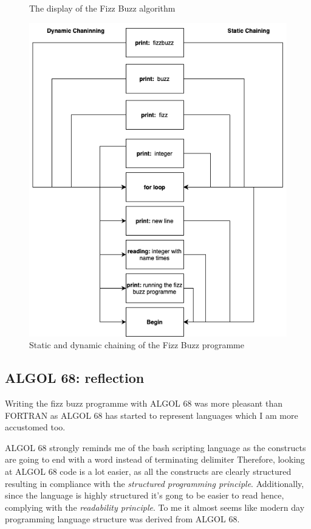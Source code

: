 \documentclass[
	12pt, %
]{fphw}
\begin{document}
\begin{figure}[!htb]
\begin{minipage}[b]{0.45\textwidth}
    \caption{The display of the Fizz Buzz algorithm}
    \label{ALGOL:Display}
  \end{minipage}
  \hfill
  \begin{minipage}[b]{0.45\textwidth}
    \includegraphics[width=\textwidth]{figures/stack.png}
    \caption{Static and dynamic chaining of the Fizz Buzz programme}
    \label{ALGOL:Chaining}
    \end{minipage}
\end{figure}

\subsection{ALGOL 68: reflection}
Writing the fizz buzz programme with ALGOL 68 was more pleasant than FORTRAN as
ALGOL 68 has started to represent languages which I am more accustomed too. \par

ALGOL 68 strongly reminds me of the bash scripting language as the constructs are going
to end with a word instead of terminating delimiter Therefore, looking at ALGOL 68
code is a lot easier, as all the constructs are clearly structured resulting in
compliance with the \emph{structured programming principle}. Additionally, since
the language is highly structured it's gong to be easier to read hence, complying
with the \emph{readability principle}. To me it almost seems like modern day
programming language structure was derived from ALGOL 68.\par
\end{document}
